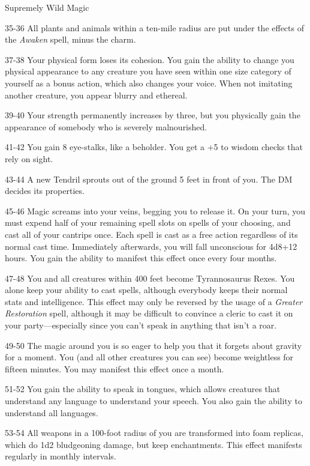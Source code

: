 \begin{rolltable}[0.6\textheight/0pt]{Supremely Wild Magic}
\item[35-36] All plants and animals within a ten-mile radius are put under the effects of the \textit{Awaken} spell, minus the charm.
\item[37-38] Your physical form loses its cohesion.
You gain the ability to change you physical appearance to any creature you have seen within one size category of yourself as a bonus action, which also changes your voice.
When not imitating another creature, you appear blurry and ethereal.
\item[39-40] Your strength permanently increases by three, but you physically gain the appearance of somebody who is severely malnourished.
\item[41-42] You gain 8 eye-stalks, like a beholder. You get a +5 to wisdom checks that rely on sight.
\item[43-44] A new Tendril sprouts out of the ground 5 feet in front of you. The DM decides its properties.
\item[45-46] Magic screams into your veins, begging you to release it.
On your turn, you must expend half of your remaining spell slots on spells of your choosing, and cast all of your cantrips once.
Each spell is cast as a free action regardless of its normal cast time.
Immediately afterwards, you will fall unconscious for 4d8+12 hours.
You gain the ability to manifest this effect once every four months.
\item[47-48] You and all creatures within 400 feet become Tyrannosaurus Rexes.
You alone keep your ability to cast spells, although everybody keeps their normal stats and intelligence.
This effect may only be reversed by the usage of a \textit{Greater Restoration} spell, although it may be difficult to convince a cleric to cast it on your party---especially since you can't speak in anything that isn't a roar.
\item[49-50] The magic around you is so eager to help you that it forgets about gravity for a moment.
You (and all other creatures you can see) become weightless for fifteen minutes.
You may manifest this effect once a month.
\item[51-52] You gain the ability to speak in tongues, which allows creatures that understand any language to understand your speech.
You also gain the ability to understand all languages.
\item[53-54] All weapons in a 100-foot radius of you are transformed into foam replicas, which do 1d2 bludgeoning damage, but keep enchantments.
This effect manifests regularly in monthly intervals.

\end{rolltable}

